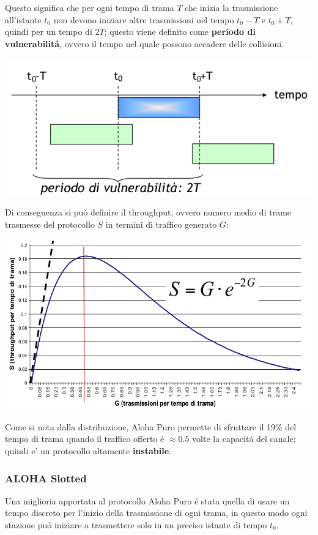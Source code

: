 \documentclass[12pt]{article}
\begin{document}
Questo significa che per ogni tempo di trama $T$ che inizia la trasmissione all'istante $t_0$ non devono iniziare altre
trasmissioni nel tempo $t_0-T$ e $t_0+T$, quindi per un tempo di $2T$; questo viene definito come \textbf{periodo di 
vulnerabilit\'a}, ovvero il tempo nel quale possono accadere delle collisioni.
\begin{center}
	\includegraphics[scale=0.49]{livello_collegamento-img4.png}
\end{center}
Di conseguenza si pu\'o definire il throughput, ovvero numero medio di trame trasmesse del protocollo $S$ in termini di 
traffico generato $G$:
\begin{center}
	\includegraphics[scale=0.6]{livello_collegamento-img5.png}
\end{center}
Come si nota dalla distribuzione, Aloha Puro permette di sfruttare il 19\% del tempo di trama quando il traffico
offerto \'e $\approx 0.5$ volte la capacit\'a del canale; quindi e' un protocollo altamente \textbf{instabile}.

\clearpage
\subsubsection{ALOHA Slotted}\label{mac-allorazione-canale-a-contesa-aloha-slotted}
Una miglioria apportata al protocollo Aloha Puro \'e stata quella di usare un tempo discreto 
per l'inizio della trasmissione di ogni trama, in questo modo ogni stazione pu\'o iniziare a trasmettere solo in un 
preciso istante di tempo $t_0$. 
\end{document}
